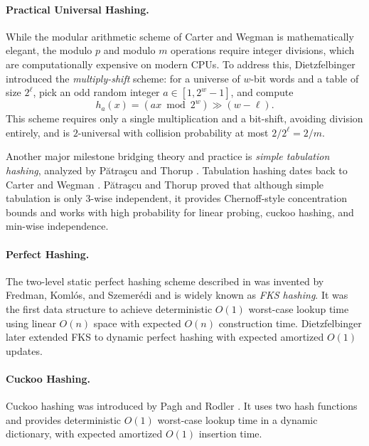 \paragraph*{Practical Universal Hashing.}
While the modular arithmetic scheme of Carter and Wegman is mathematically elegant, the modulo $p$ and modulo $m$ operations require integer divisions, which are computationally expensive on modern CPUs. To address this, Dietzfelbinger \etal \cite{d-uhkwr-96} introduced the \emph{multiply-shift} scheme: for a universe of $w$-bit words and a table of size $2^\ell$, pick an odd random integer $a \in [1, 2^w-1]$, and compute
\begin{equation*}
    h_a(x) = (ax \bmod 2^w) \gg (w - \ell).
\end{equation*}
This scheme requires only a single multiplication and a bit-shift, avoiding division entirely, and is $2$-universal with collision probability at most $2/2^\ell = 2/m$.

Another major milestone bridging theory and practice is \emph{simple tabulation hashing}, analyzed by P{\u a}tra{\c s}cu and Thorup \cite{pt-pstuh-12}. Tabulation hashing dates back to Carter and Wegman \cite{cw-uchf-79}. P{\u a}tra{\c s}cu and Thorup proved that although simple tabulation is only $3$-wise independent, it provides Chernoff-style concentration bounds and works with high probability for linear probing, cuckoo hashing, and min-wise independence.

\paragraph*{Perfect Hashing.}
The two-level static perfect hashing scheme described in  was invented by Fredman, Koml{\'o}s, and Szemer{\'e}di \cite{fks-sstwc-84} and is widely known as \emph{FKS hashing}. It was the first data structure to achieve deterministic $O(1)$ worst-case lookup time using linear $O(n)$ space with expected $O(n)$ construction time. Dietzfelbinger \etal later extended FKS to dynamic perfect hashing with expected amortized $O(1)$ updates.

\paragraph*{Cuckoo Hashing.}
Cuckoo hashing was introduced by Pagh and Rodler \cite{pr-ch-04}. It uses two hash functions and provides deterministic $O(1)$ worst-case lookup time in a dynamic dictionary, with expected amortized $O(1)$ insertion time.

